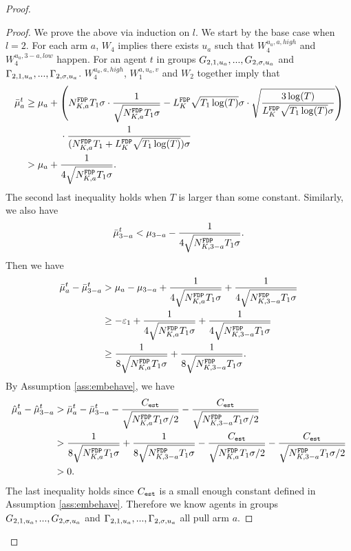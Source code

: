 \begin{proof}
\begin{proof}
We prove the above via induction on $l$. %
We start by the base case when $l=2$. For each arm $a$, $W_4$ implies there exists $u_a$ such that $W^{u_a,a,high}_4$ and $W^{u_a,3-a,low}_4$ happen. For an agent $t$  in groups $G_{2,1,u_a},...,G_{2,\NG,u_a}$ and $\Gamma_{2,1,u_a},...,\Gamma_{2,\NG,u_a}$.
$W_4^{u_a,a,high}$,  $W_1^{a,u_a,v}$ and $W_2$ together imply that 
\begin{align*}
\bar{\mu}_a ^t &\geq \mu_a + \left(\fdpN T_1\NG \cdot \frac{1}{\sqrt{\fdpN T_1\NG}} - \GdT \sqrt{T_1\log(T)} \NG\cdot \sqrt{\frac{3\log(T)}{ \GdT \sqrt{T_1\log(T)}\NG}} \right) \\
&~~~~~~~~~~~\cdot \frac{1}{(\fdpN T_1+ \GdT \sqrt{T_1\log(T)})\NG} \\
&> \mu_a + \frac{1}{4\sqrt{\fdpN T_1\NG}}.
\end{align*}
The second last inequality holds when $T$ is larger than some constant.
Similarly, we also have
\[
\bar{\mu}_{3-a}^t< \mu_{3-a}   - \frac{1}{4\sqrt{\fdpN[3-a] T_1\NG}}.
\]
Then we have
\begin{align*}
\bar{\mu}^t_a - \bar{\mu}^t_{3-a} &> \mu_a - \mu_{3-a} + \frac{1}{4\sqrt{\fdpN T_1\NG}} + \frac{1}{4\sqrt{\fdpN[3-a] T_1\NG}}\\
&\geq -\varepsilon_1+ \frac{1}{4\sqrt{\fdpN T_1\NG}} + \frac{1}{4\sqrt{\fdpN[3-a] T_1\NG}}\\
&\geq \frac{1}{8\sqrt{\fdpN T_1\NG}} + \frac{1}{8\sqrt{\fdpN[3-a] T_1\NG}}.
\end{align*}
By Assumption \ref{ass:embehave}, we have
\begin{align*}
\hat{\mu}_a^t - \hat{\mu}_{3-a}^t &> \bar{\mu}^t_a - \bar{\mu}^t_{3-a} -  \frac{\estC}{\sqrt{\fdpN T_1\NG/2}} - \frac{\estC}{\sqrt{\fdpN[3-a] T_1\NG/2}}\\
&> \frac{1}{8\sqrt{\fdpN T_1\NG}} + \frac{1}{8\sqrt{\fdpN[3-a] T_1\NG}} -   \frac{\estC}{\sqrt{\fdpN T_1\NG/2}} - \frac{\estC}{\sqrt{\fdpN[3-a] T_1\NG/2}}\\
&>0.
\end{align*}
The last inequality holds since $\estC$ is a small enough constant defined in Assumption \ref{ass:embehave}. Therefore we know agents in groups $G_{2,1,u_a},...,G_{2,\NG,u_a}$ and $\Gamma_{2,1,u_a},...,\Gamma_{2,\NG,u_a}$ all pull arm $a$.


\end{proof}
\end{proof}
